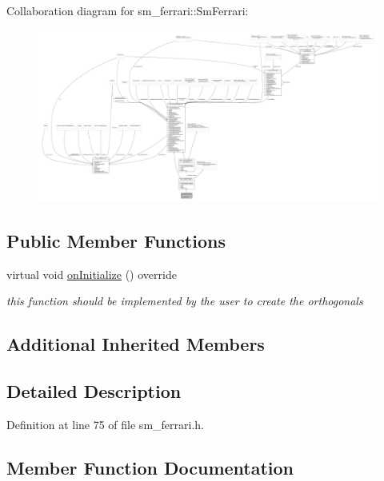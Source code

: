 Collaboration diagram for sm\+\_\+ferrari\+:\+:Sm\+Ferrari\+:
\nopagebreak
\begin{figure}[H]
\begin{center}
\leavevmode
\includegraphics[width=350pt]{structsm__ferrari_1_1SmFerrari__coll__graph}
\end{center}
\end{figure}
\subsection*{Public Member Functions}
\begin{DoxyCompactItemize}
\item 
virtual void \hyperlink{structsm__ferrari_1_1SmFerrari_a024d7b61edb9121eb68bfbcc20618636}{on\+Initialize} () override
\begin{DoxyCompactList}\small\item\em this function should be implemented by the user to create the orthogonals \end{DoxyCompactList}\end{DoxyCompactItemize}
\subsection*{Additional Inherited Members}


\subsection{Detailed Description}


Definition at line 75 of file sm\+\_\+ferrari.\+h.



\subsection{Member Function Documentation}
\mbox{\label{structsm__ferrari_1_1SmFerrari_a024d7b61edb9121eb68bfbcc20618636}} 
